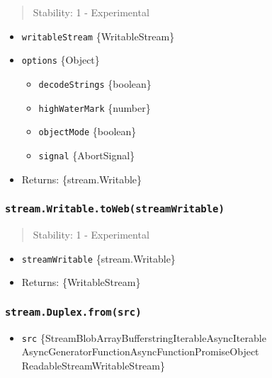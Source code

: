 \begin{quote}
Stability: 1 - Experimental
\end{quote}

\begin{itemize}
\tightlist
\item
  \texttt{writableStream} \{WritableStream\}
\item
  \texttt{options} \{Object\}

  \begin{itemize}
  \tightlist
  \item
    \texttt{decodeStrings} \{boolean\}
  \item
    \texttt{highWaterMark} \{number\}
  \item
    \texttt{objectMode} \{boolean\}
  \item
    \texttt{signal} \{AbortSignal\}
  \end{itemize}
\item
  Returns: \{stream.Writable\}
\end{itemize}

\subsubsection{\texorpdfstring{\texttt{stream.Writable.toWeb(streamWritable)}}{stream.Writable.toWeb(streamWritable)}}\label{stream.writable.towebstreamwritable}

\begin{quote}
Stability: 1 - Experimental
\end{quote}

\begin{itemize}
\tightlist
\item
  \texttt{streamWritable} \{stream.Writable\}
\item
  Returns: \{WritableStream\}
\end{itemize}

\subsubsection{\texorpdfstring{\texttt{stream.Duplex.from(src)}}{stream.Duplex.from(src)}}\label{stream.duplex.fromsrc}

\begin{itemize}
\tightlist
\item
  \texttt{src}
  \{Stream\textbar Blob\textbar ArrayBuffer\textbar string\textbar Iterable\textbar AsyncIterable\textbar{}
  AsyncGeneratorFunction\textbar AsyncFunction\textbar Promise\textbar Object\textbar{}
  ReadableStream\textbar WritableStream\}
\end{itemize}

